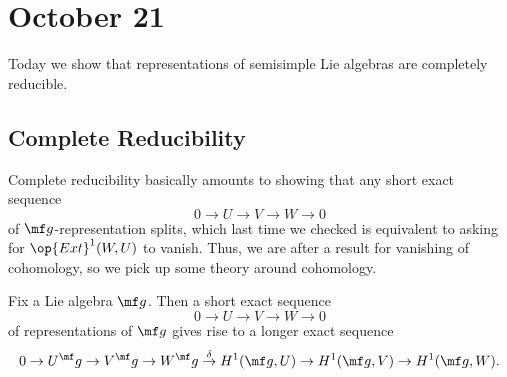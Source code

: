 \documentclass[../notes.tex]{subfiles}
\begin{document}
\section{October 21}
Today we show that representations of semisimple Lie algebras are completely reducible.

\subsection{Complete Reducibility}
Complete reducibility basically amounts to showing that any short exact sequence
\[0\to U\to V\to W\to0\]
of $\mf g$-representation splits, which last time we checked is equivalent to asking for $\op{Ext}^1(W,U)$ to vanish. Thus, we are after a result for vanishing of cohomology, so we pick up some theory around cohomology.
\begin{lemma} \label{lem:les-h1}
	Fix a Lie algebra $\mf g$. Then a short exact sequence
	\[0\to U\to V\to W\to0\]
	of representations of $\mf g$ gives rise to a longer exact sequence
	\[0\to U^\mf g\to V^\mf g\to W^\mf g\stackrel\delta\to H^1(\mf g,U)\to H^1(\mf g,V)\to H^1(\mf g,W).\]
\end{lemma}
\end{document}

